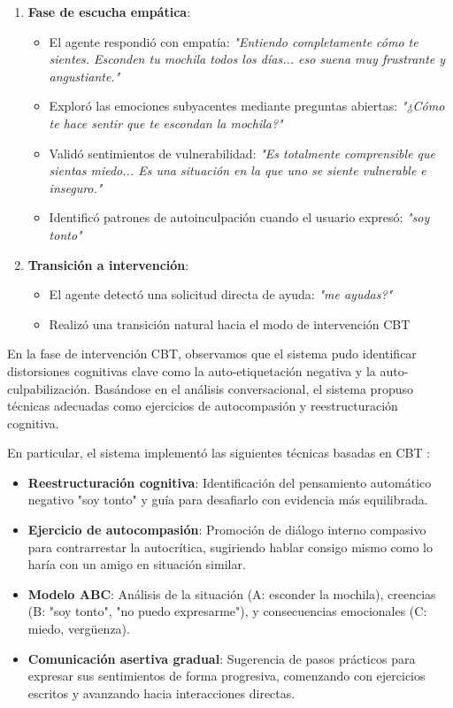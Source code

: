 \documentclass[conference]{IEEEtran}
\begin{document}
\begin{enumerate}
\item \textbf{Fase de escucha empática}:
    \begin{itemize}
    \item El agente respondió con empatía: \textit{"Entiendo completamente cómo te sientes. Esconden tu mochila todos los días... eso suena muy frustrante y angustiante."}
    \item Exploró las emociones subyacentes mediante preguntas abiertas: \textit{"¿Cómo te hace sentir que te escondan la mochila?"}
    \item Validó sentimientos de vulnerabilidad: \textit{"Es totalmente comprensible que sientas miedo... Es una situación en la que uno se siente vulnerable e inseguro."}
    \item Identificó patrones de autoinculpación cuando el usuario expresó: \textit{"soy tonto"}
    \end{itemize}

\item \textbf{Transición a intervención}:
    \begin{itemize}
    \item El agente detectó una solicitud directa de ayuda: \textit{"me ayudas?"}
    \item Realizó una transición natural hacia el modo de intervención CBT
    \end{itemize}
\end{enumerate}

En la fase de intervención CBT, observamos que el sistema pudo identificar distorsiones cognitivas clave como la auto-etiquetación negativa y la auto-culpabilización. Basándose en el análisis conversacional, el sistema propuso técnicas adecuadas como ejercicios de autocompasión y reestructuración cognitiva.

En particular, el sistema implementó las siguientes técnicas basadas en CBT \cite{b17}:

\begin{itemize}
\item \textbf{Reestructuración cognitiva}: Identificación del pensamiento automático negativo "soy tonto" y guía para desafiarlo con evidencia más equilibrada.
\item \textbf{Ejercicio de autocompasión}: Promoción de diálogo interno compasivo para contrarrestar la autocrítica, sugiriendo hablar consigo mismo como lo haría con un amigo en situación similar.
\item \textbf{Modelo ABC}: Análisis de la situación (A: esconder la mochila), creencias (B: "soy tonto", "no puedo expresarme"), y consecuencias emocionales (C: miedo, vergüenza).
\item \textbf{Comunicación asertiva gradual}: Sugerencia de pasos prácticos para expresar sus sentimientos de forma progresiva, comenzando con ejercicios escritos y avanzando hacia interacciones directas.
\end{itemize}
\end{document}
